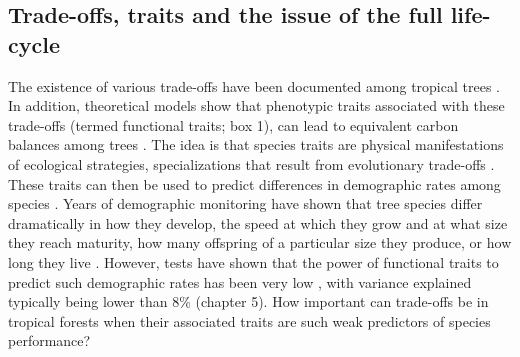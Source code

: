 \documentclass[b5paper,justified]{tufte-book} %
\begin{document}
\begin{fullwidth}
\section{Trade-offs, traits and the issue of the full life-cycle}
The existence of various trade-offs have been documented among tropical trees \citep[e.g.][]{Gilbert2006}. In addition, theoretical models show that phenotypic traits associated with these trade-offs (termed functional traits; box 1), can lead to equivalent carbon balances among trees \citep{Sterck2011}. The idea is that species traits are physical manifestations of ecological strategies, specializations that result from evolutionary trade-offs \citep{Marks2006, McGill2006}. These traits can then be used to predict differences in demographic rates among species \citep[e.g.][]{Adler2014}. Years of demographic monitoring  have shown that tree species differ dramatically in how they develop, the speed at which they grow and at what size they reach maturity, how many offspring of a particular size they produce, or how long they live \citep{Muller-Landau2008, Metcalf2009, Salguero-Gomez2016}. However, tests have shown that the power of functional traits to predict such demographic rates has been very low \citep[e.g.][]{Iida2014, Paine2015}, with variance explained typically being lower than 8\% (chapter 5). How important can trade-offs be in tropical forests when their associated traits are such weak predictors of species performance? \bigskip


\end{fullwidth}
\end{document}
